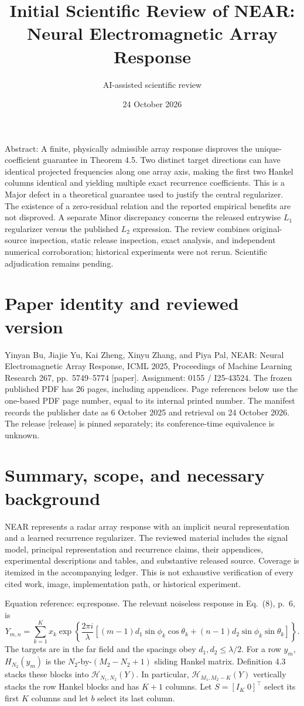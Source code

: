 \documentclass[10pt]{article}
\title{Initial Scientific Review of
NEAR: Neural Electromagnetic Array Response}
\author{AI-assisted scientific review}
\date{24 October 2026}
\begin{document}
\maketitle
Abstract: A finite, physically admissible array response disproves the unique-coefficient guarantee in Theorem 4.5. Two distinct target directions can have identical projected frequencies along one array axis, making the first two Hankel columns identical and yielding multiple exact recurrence coefficients. This is a Major defect in a theoretical guarantee used to justify the central regularizer. The existence of a zero-residual relation and the reported empirical benefits are not disproved. A separate Minor discrepancy concerns the released entrywise \(L_1\) regularizer versus the published \(L_2\) expression. The review combines original-source inspection, static release inspection, exact analysis, and independent numerical corroboration; historical experiments were not rerun. Scientific adjudication remains pending.\par
\section*{Paper identity and reviewed version}
Yinyan Bu, Jiajie Yu, Kai Zheng, Xinyu Zhang, and Piya Pal, NEAR: Neural Electromagnetic Array Response, ICML 2025, Proceedings of Machine Learning Research 267, pp. 5749–5774 [paper]. Assignment: 0155 / I25-43524. The frozen published PDF has 26 pages, including appendices. Page references below use the one-based PDF page number, equal to its internal printed number. The manifest records the publisher date as 6 October 2025 and retrieval on 24 October 2026. The release [release] is pinned separately; its conference-time equivalence is unknown.\par
\section*{Summary, scope, and necessary background}
NEAR represents a radar array response with an implicit neural representation and a learned recurrence regularizer. The reviewed material includes the signal model, principal representation and recurrence claims, their appendices, experimental descriptions and tables, and substantive released source. Coverage is itemized in the accompanying ledger. This is not exhaustive verification of every cited work, image, implementation path, or historical experiment.\par
Equation reference: eq:response. The relevant noiseless response in Eq. (8), p. 6, is \[
Y_{m,n}=\sum_{k=1}^{K}x_k
 \exp\!\left\{\frac{2\pi i}{\lambda}
 [(m-1)d_1\sin\phi_k\cos\theta_k+
  (n-1)d_2\sin\phi_k\sin\theta_k]\right\}.\] The targets are in the far field and the spacings obey \(d_1,d_2\leq\lambda/2\). For a row \(y_m\), \(H_{N_2}(y_m)\) is the \(N_2\)-by-\((M_2-N_2+1)\) sliding Hankel matrix. Definition 4.3 stacks these blocks into \(\mathcal H_{N_1,N_2}(Y)\). In particular, \(\mathcal H_{M_1,M_2-K}(Y)\) vertically stacks the row Hankel blocks and has \(K+1\) columns. Let \(S=[I_K\;0]^\top\) select its first \(K\) columns and let \(b\) select its last column.\par
\end{document}
